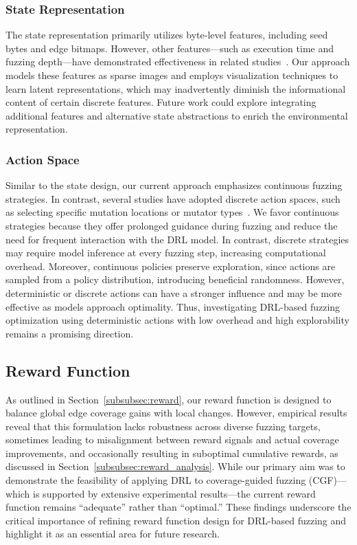 \documentclass[lettersize,journal]{IEEEtran}
\begin{document}
\subsubsection{State Representation}
The state representation primarily utilizes byte-level features, including seed bytes and edge bitmaps. However, other features—such as execution time and fuzzing depth—have demonstrated effectiveness in related studies~\cite{binosiRainfuzzReinforcementlearningDriven2023, linDeepGoPredictiveDirected2024}. Our approach models these features as sparse images and employs visualization techniques to learn latent representations, which may inadvertently diminish the informational content of certain discrete features. Future work could explore integrating additional features and alternative state abstractions to enrich the environmental representation.

\subsubsection{Action Space}
Similar to the state design, our current approach emphasizes continuous fuzzing strategies. In contrast, several studies have adopted discrete action spaces, such as selecting specific mutation locations or mutator types~\cite{bottingerDeepReinforcementFuzzing2018, liangRLFDirectedFuzzing2022}. We favor continuous strategies because they offer prolonged guidance during fuzzing and reduce the need for frequent interaction with the DRL model. In contrast, discrete strategies may require model inference at every fuzzing step, increasing computational overhead. Moreover, continuous policies preserve exploration, since actions are sampled from a policy distribution, introducing beneficial randomness. However, deterministic or discrete actions can have a stronger influence and may be more effective as models approach optimality. Thus, investigating DRL-based fuzzing optimization using deterministic actions with low overhead and high explorability remains a promising direction.

\subsection{Reward Function}
As outlined in Section~\ref{subsubsec:reward}, our reward function is designed to balance global edge coverage gains with local changes. However, empirical results reveal that this formulation lacks robustness across diverse fuzzing targets, sometimes leading to misalignment between reward signals and actual coverage improvements, and occasionally resulting in suboptimal cumulative rewards, as discussed in Section~\ref{subsubsec:reward_analysis}. While our primary aim was to demonstrate the feasibility of applying DRL to coverage-guided fuzzing (CGF)—which is supported by extensive experimental results—the current reward function remains “adequate” rather than “optimal.” These findings underscore the critical importance of refining reward function design for DRL-based fuzzing and highlight it as an essential area for future research.
\end{document}
